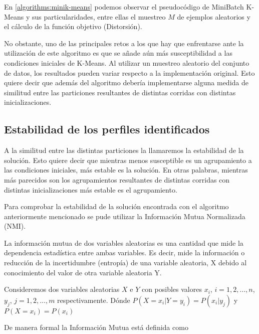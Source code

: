 
En \ref{algorithms:minik-means} podemos observar el pseudocódigo de MiniBatch K-Means y sus particularidades, entre ellas el muestreo $M$ de ejemplos aleatorios y el cálculo de la función objetivo (Distorsión).

 

No obstante, uno de las principales retos a los que hay que enfrentarse ante la utilización de este algoritmo es que se añade aún más susceptibilidad a las condiciones iniciales de K-Means. Al utilizar un muestreo aleatorio del conjunto de datos, los resultados pueden variar respecto a la implementación original. Esto quiere decir que además del algoritmo debería implementarse alguna medida de similitud entre las particiones resultantes de distintas corridas con distintas inicializaciones. 

\subsection{Estabilidad de los perfiles identificados}

A la similitud entre las distintas particiones la llamaremos la estabilidad de la solución. Esto quiere decir que mientras menos susceptible es un agrupamiento a las condiciones iniciales, más estable es la solución. En otras palabras, mientras más parecidos son los agrupamientos resultantes de distintas corridas con distintas inicializaciones más estable es el agrupamiento.

Para comprobar la estabilidad de la solución encontrada con el algoritmo anteriormente mencionado se pude utilizar la Información Mutua Normalizada (NMI).

La información mutua de dos variables aleatorias es una cantidad que mide la dependencia estadística entre ambas variables. Es decir, mide la información o reducción de la incertidumbre (entropía) de una variable aleatoria, X debido al conocimiento del valor de otra variable aleatoria Y.

Consideremos dos variables aleatorias $X$ e $Y$ con posibles valores $x_i$, $i=1,2,...,n$, $y_j$, $j=1,2,...,m$ respectivamente. Dónde $ 
{\displaystyle P(X=x_{i}|Y=y_{i})=P(x_{i}|y_{j})}$ y ${\displaystyle P(X=x_{i})=P(x_{i})}$

De manera formal la Información Mutua está definida como

